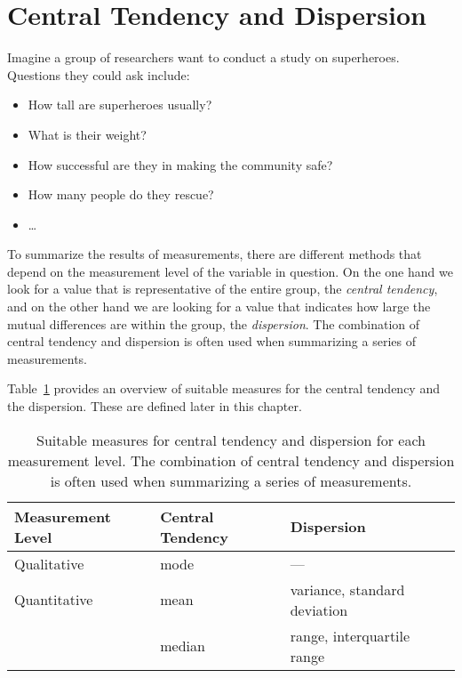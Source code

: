 \section{Central Tendency and Dispersion}

Imagine a group of researchers want to conduct a study on superheroes. Questions they could ask include:

\begin{itemize}
    \item How tall are superheroes usually?
    \item What is their weight?
    \item How successful are they in making the community safe?
    \item How many people do they rescue?
    \item \ldots
\end{itemize}

To summarize the results of measurements, there are different methods that depend on the measurement level of the variable in question. On the one hand we look for a value that is representative of the entire group, the \emph{central tendency}, and on the other hand we are looking for a value that indicates how large the mutual differences are within the group, the \emph{dispersion}. The combination of central tendency and dispersion is often used when summarizing a series of measurements.

Table~\ref{tab:centrum-spreidingsmaten} provides an overview of suitable measures for the central tendency and the dispersion. These are defined later in this chapter.


\begin{table}
    \centering
    \begin{tabular}{lll}
        \toprule
        \textbf{Measurement Level}  & \textbf{Central Tendency} & \textbf{Dispersion} \\
        \midrule
        Qualitative                 & mode                      & ---                 \\
        \midrule
        Quantitative                & mean            & variance, standard deviation  \\
                                    & median          & range, interquartile range    \\
        \bottomrule
    \end{tabular}
    \caption[Suitable measures for central tendency and dispersion for each measurement level.]{Suitable measures for central tendency and dispersion for each measurement level. The combination of central tendency and dispersion is often used when summarizing a series of measurements.}
    \label{tab:centrum-spreidingsmaten}
\end{table}

